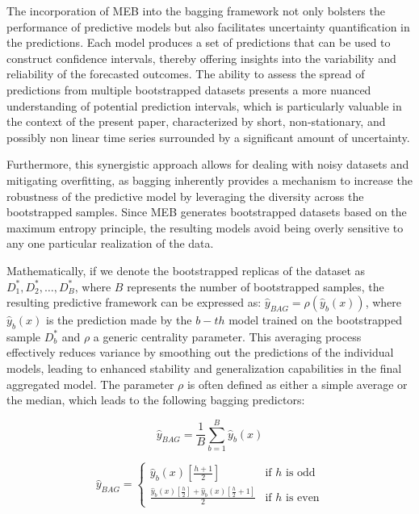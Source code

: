 \documentclass[ijoc,sglanonrev]{informs4}
\begin{document}
The incorporation of MEB into the bagging framework not only bolsters the performance of predictive models but also facilitates uncertainty quantification in the predictions. Each model produces a set of predictions that can be used to construct confidence intervals, thereby offering insights into the variability and reliability of the forecasted outcomes. The ability to assess the spread of predictions from multiple bootstrapped datasets presents a more nuanced understanding of potential prediction intervals, which is particularly valuable in the context of the present paper, characterized by short, non-stationary, and possibly non linear time series surrounded by a significant amount of uncertainty.

Furthermore, this synergistic approach allows for dealing with noisy datasets and mitigating overfitting, as bagging inherently provides a mechanism to increase the robustness of the predictive model by leveraging the diversity across the bootstrapped samples. Since MEB generates bootstrapped datasets based on the maximum entropy principle, the resulting models avoid being overly sensitive to any one particular realization of the data.

Mathematically, if we denote the bootstrapped replicas of the dataset as $D^*_1, D^*_2, \ldots, D^*_B$, where $B$  represents the number of bootstrapped samples, the resulting predictive framework can be expressed as:  $\hat{y}_{\textit{BAG}} = \rho( \hat{y}_{b}(x) )$, where $\hat{y}_{b}(x)$ is the prediction made by the $b-th$ model trained on the bootstrapped sample $ D^*_b $  and $\rho$ a generic centrality parameter. 
This averaging process effectively reduces variance by smoothing out the predictions of the individual models, leading to enhanced stability and generalization capabilities in the final aggregated model.  The parameter $\rho$ is often defined as either a simple average or the median, which leads to the following bagging predictors:

\begin{equation}
\hat{y}_{\textit{BAG}}  = \frac{1}{B} \sum_{b=1}^{B} \hat{y}_{b}(x)
\end{equation}

\begin{equation}
\hat{y}_{\textit{BAG}}  = 
\begin{cases} 
\hat{y}_{b}(x) \left[\frac{h+1}{2}\right] & \text{if } h \text{ is odd} \\ 
\frac{\hat{y}_{b}(x)\left[\frac{h}{2}\right] + \hat{y}_{b}(x)\left[\frac{h}{2} + 1\right]}{2} & \text{if } h \text{ is even} 
\end{cases}
\end{equation}
\end{document}
